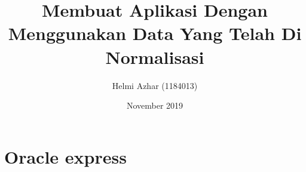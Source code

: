 ﻿\documentclass{article}
\title{Membuat Aplikasi Dengan Menggunakan Data Yang Telah Di Normalisasi}
\author{Helmi Azhar (1184013) }
\date{November 2019}
\begin{document}
\maketitle

\section{Oracle express}
\begin{enumerate}
\usepackage{Oracle Apex merupakan suatu aplikasi atau tools  untuk memudahkan apa yang kita butuhkan. Sesuai namanya, oracle express bila dipelajari lebih dalam banyak memberi kemudahan dalam melayanani kebutuhan user contohnya dalam pembuatan aplikasi sederhana,belajar function dan lain-lain. Oracle apex juga dapat mengembangkan aplikasi web desktop dan seluler, memvisualisasikan dan memelihara data basis data, dan meningkatkan keterampilan sql dan kemampuan basis data}
\end{enumerate}

\begin{enumerate}
    \usepackage{pada tugas kali ini saya akan membuat aplikasi di oracle express dengan menginput data dari excell yang telah di normalisasi dengan menginputkan data tabel dosen,tabel jadwal,tabel kuliah,tabel mahasiswa,dan tabel nilai.}
\end{enumerate}
\end{document}
